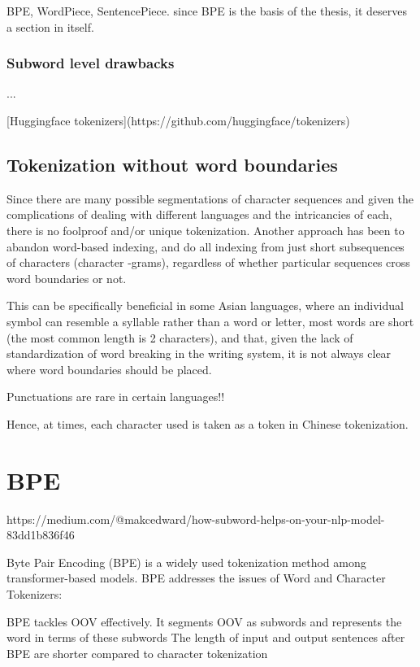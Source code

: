 BPE, WordPiece, SentencePiece. since BPE is the basis of the thesis, it deserves a section in itself.

\subsubsection{Subword level drawbacks}

...


[Huggingface tokenizers](https://github.com/huggingface/tokenizers)

\subsection{Tokenization without word boundaries}\label{subsec:wordtokwowb}

Since there are many possible segmentations of character sequences and given the complications of dealing with different languages and the intricancies of each, there is no foolproof and/or unique tokenization. Another approach has been to abandon word-based indexing, and do all indexing from just short subsequences of characters (character -grams), regardless of whether particular sequences cross word boundaries or not.

This can be specifically beneficial in some Asian languages, where an individual symbol can resemble a syllable rather than a word or letter,  most words are short (the most common length is 2 characters), and that, given the lack of standardization of word breaking in the writing system, it is not always clear where word boundaries should be placed.

Punctuations are rare in certain languages!!

Hence, at times, each character used is taken as a token in Chinese tokenization.

\section{BPE}

https://medium.com/@makcedward/how-subword-helps-on-your-nlp-model-83dd1b836f46

Byte Pair Encoding (BPE) is a widely used tokenization method among transformer-based models. BPE addresses the issues of Word and Character Tokenizers:

    BPE tackles OOV effectively. It segments OOV as subwords and represents the word in terms of these subwords
    The length of input and output sentences after BPE are shorter compared to character tokenization

